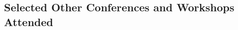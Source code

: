\documentclass[10pt,letterpaper]{article}
\renewenvironment{itemize}{
  \begin{list}{}{
    \setlength{\leftmargin}{1.5em}
    \setlength{\itemsep}{0.25em}
    \setlength{\parskip}{0pt}
    \setlength{\parsep}{0.25em}
  }
}{
  \end{list}
}
\begin{document}


\subsection*{Selected Other Conferences and Workshops Attended}
\end{document}
